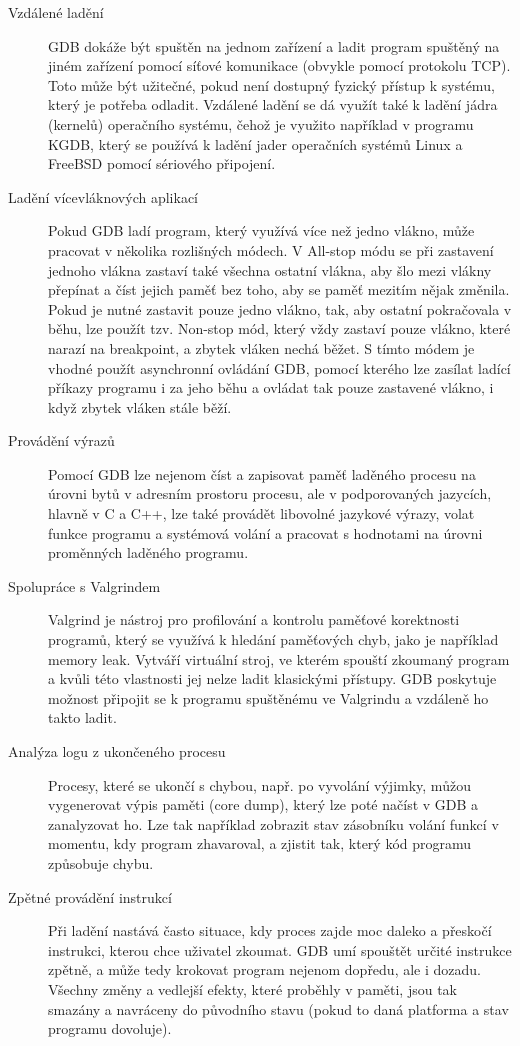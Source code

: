 \documentclass[bc,male,python,dept460]{diploma}						%
\begin{document}
		\begin{description}
			\item[Vzdálené ladění]
				GDB dokáže být spuštěn na jednom zařízení a ladit program spuštěný na jiném zařízení pomocí síťové komunikace (obvykle pomocí protokolu TCP).
				Toto může být užitečné, pokud není dostupný fyzický přístup k systému, který je potřeba odladit.
				Vzdálené ladění se dá využít také k ladění jádra (kernelů) operačního systému, čehož je využito například v programu KGDB, který se používá k ladění
				jader operačních systémů Linux a FreeBSD pomocí sériového připojení.
			\item[Ladění vícevláknových aplikací]
				Pokud GDB ladí program, který využívá více než jedno vlákno, může pracovat v několika rozlišných módech\cite{gdb-multithreading}.
				V All-stop módu se při zastavení jednoho vlákna zastaví také všechna ostatní vlákna, aby šlo mezi vlákny přepínat a číst jejich paměť bez toho,
				aby se paměť mezitím nějak změnila. Pokud je nutné zastavit pouze jedno vlákno, tak, aby ostatní pokračovala v běhu, lze použít tzv. Non-stop mód,
				který vždy zastaví pouze vlákno, které narazí na breakpoint, a zbytek vláken nechá běžet. S tímto módem je vhodné použít asynchronní ovládání GDB,
				pomocí kterého lze zasílat ladící příkazy programu i za jeho běhu a ovládat tak pouze zastavené vlákno, i když zbytek vláken stále běží.
			\item[Provádění výrazů]
				Pomocí GDB lze nejenom číst a zapisovat paměť laděného procesu na úrovni bytů v adresním prostoru procesu, ale v podporovaných jazycích, hlavně
				v C a C++, lze také provádět libovolné jazykové výrazy, volat funkce programu a systémová volání a pracovat s hodnotami na úrovni proměnných
				laděného programu.
			\item[Spolupráce s Valgrindem]
				Valgrind je nástroj pro profilování a kontrolu paměťové korektnosti programů, který se využívá k hledání paměťových chyb, jako je například memory
				leak. Vytváří virtuální stroj, ve kterém spouští zkoumaný program a kvůli této vlastnosti jej nelze ladit klasickými přístupy. GDB poskytuje
				možnost připojit se k programu spuštěnému ve Valgrindu a vzdáleně ho takto ladit.
			\item[Analýza logu z ukončeného procesu]
				Procesy, které se ukončí s chybou, např. po vyvolání výjimky, můžou vygenerovat výpis paměti (core dump), který lze poté načíst v GDB a zanalyzovat ho.
				Lze tak například zobrazit stav zásobníku volání funkcí v momentu, kdy program zhavaroval, a zjistit tak, který kód programu způsobuje chybu.
			\item[Zpětné provádění instrukcí]
				Při ladění nastává často situace, kdy proces zajde moc daleko a přeskočí instrukci, kterou chce uživatel zkoumat. GDB umí spouštět určité instrukce
				zpětně, a může tedy krokovat program nejenom dopředu, ale i dozadu. Všechny změny a vedlejší efekty, které proběhly v paměti, jsou tak smazány a
				navráceny do původního stavu (pokud to daná platforma a stav programu dovoluje).
		\end{description}
		
\end{document}
